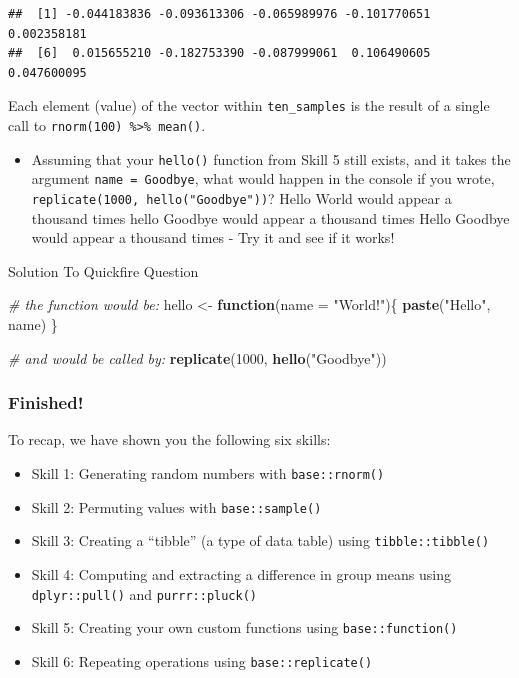 \documentclass[]{book}
\newenvironment{Shaded}{\begin{snugshade}}{\end{snugshade}}
\newcommand{\CommentTok}[1]{\textcolor[rgb]{0.56,0.35,0.01}{\textit{#1}}}
\newcommand{\ControlFlowTok}[1]{\textcolor[rgb]{0.13,0.29,0.53}{\textbf{#1}}}
\newcommand{\DataTypeTok}[1]{\textcolor[rgb]{0.13,0.29,0.53}{#1}}
\newcommand{\DecValTok}[1]{\textcolor[rgb]{0.00,0.00,0.81}{#1}}
\newcommand{\KeywordTok}[1]{\textcolor[rgb]{0.13,0.29,0.53}{\textbf{#1}}}
\newcommand{\NormalTok}[1]{#1}
\newcommand{\StringTok}[1]{\textcolor[rgb]{0.31,0.60,0.02}{#1}}
\providecommand{\tightlist}{%
  \setlength{\itemsep}{0pt}\setlength{\parskip}{0pt}}
\begin{document}
\begin{verbatim}
##  [1] -0.044183836 -0.093613306 -0.065989976 -0.101770651  0.002358181
##  [6]  0.015655210 -0.182753390 -0.087999061  0.106490605  0.047600095
\end{verbatim}

Each element (value) of the vector within \texttt{ten\_samples} is the result of a single call to \texttt{rnorm(100)\ \%\textgreater{}\%\ mean()}.

\begin{itemize}
\tightlist
\item
  Assuming that your \texttt{hello()} function from Skill 5 still exists, and it takes the argument \texttt{name\ =\ Goodbye}, what would happen in the console if you wrote, \texttt{replicate(1000,\ hello("Goodbye"))}? Hello World would appear a thousand times hello Goodbye would appear a thousand times Hello Goodbye would appear a thousand times - Try it and see if it works!
\end{itemize}

Solution To Quickfire Question

\begin{Shaded}
\begin{Highlighting}[]
\CommentTok{# the function would be:}
\NormalTok{hello <-}\StringTok{ }\ControlFlowTok{function}\NormalTok{(}\DataTypeTok{name =} \StringTok{"World!"}\NormalTok{)\{}
  \KeywordTok{paste}\NormalTok{(}\StringTok{"Hello"}\NormalTok{, name)}
\NormalTok{\}}

\CommentTok{# and would be called by:}
\KeywordTok{replicate}\NormalTok{(}\DecValTok{1000}\NormalTok{, }\KeywordTok{hello}\NormalTok{(}\StringTok{"Goodbye"}\NormalTok{))}
\end{Highlighting}
\end{Shaded}

\hypertarget{finished-11}{%
\subsubsection{Finished!}\label{finished-11}}

To recap, we have shown you the following six skills:

\begin{itemize}
\tightlist
\item
  Skill 1: Generating random numbers with \texttt{base::rnorm()}
\item
  Skill 2: Permuting values with \texttt{base::sample()}\\
\item
  Skill 3: Creating a ``tibble'' (a type of data table) using \texttt{tibble::tibble()}
\item
  Skill 4: Computing and extracting a difference in group means using \texttt{dplyr::pull()} and \texttt{purrr::pluck()}
\item
  Skill 5: Creating your own custom functions using \texttt{base::function()}
\item
  Skill 6: Repeating operations using \texttt{base::replicate()}
\end{itemize}
\end{document}
